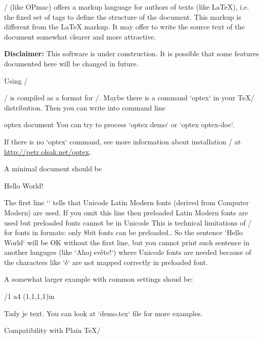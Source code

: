 \OpTeX/ (like OPmac) offers a markup language for authors of texts (like \LaTeX),
i.e. the fixed set of tags to define the structure of the document. This
markup is different from the \LaTeX{} markup. It may offer to write the
source text of the document somewhat clearer and more attractive. 

\new
{\bf Disclaimer:} This software is under construction.
It is possible that some features documented here will be changed in future.


\sec Using \OpTeX/

\new
\OpTeX/ is compiled as a format for \LuaTeX/. Maybe there is a command
`optex` in your \TeX/ distribution. Then you can write into command line

\begtt
optex document
\endtt
%
You can try to process `optex demo` or `optex optex-doc`.

If there is no `optex` command, see more information about installation
\OpTeX/ at \url{http://petr.olsak.net/optex}. 

A minimal document should be

\begtt
\fontfam[LMfonts]
Hello World! \bye
\endtt

The first line `\fontfam[LMfonts]` tells that Unicode Latin Modern 
fonts (derived from Computer Modern) are used. If you omit this line then
preloaded Latin Modern fonts are used but preloaded fonts cannot be in
Unicode\fnote
{This is technical limitations of \LuaTeX/ for fonts in formats:
only 8bit fonts can be preloaded.}.
So the sentence `Hello World` will be OK without the first line, but you 
cannot print such sentence in another languges (like `Ahoj světe!`) 
where Unicode fonts are needed
because of the characters like `ě` are not mapped correctly in preloaded
font.

A somewhat larger example with common settings shoud be:

\begtt
\fontfam[Termes]   %
\typosize[11/13]   %
\margins/1 a4 (1,1,1,1)in   %
\cslang            %

Tady je text.
\bye
\endtt
%
You can look at `demo.tex` file for more examples.


\sec Compatibility with Plain \TeX/

